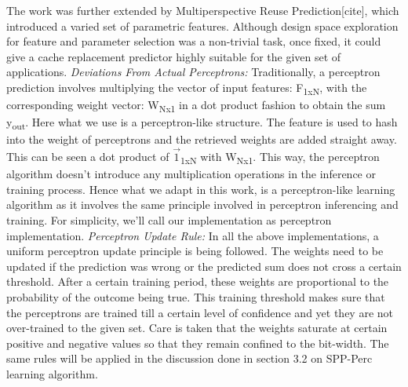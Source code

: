 \documentclass{sig-alternate}
\begin{document}
The work was further extended by Multiperspective Reuse Prediction[cite], which introduced a varied set of parametric features. Although design space exploration for feature and parameter selection was a non-trivial task, once fixed, it could give a cache replacement predictor highly suitable for the given set of applications.
\newline
\newline
\textit{Deviations From Actual Perceptrons:} Traditionally, a perceptron prediction involves multiplying the vector of input features: F\textsubscript{1xN}, with the corresponding weight vector: W\textsubscript{Nx1} in a dot product fashion to obtain the sum y\textsubscript{out}. Here what we use is a perceptron-like structure. The feature is used to hash into the weight of perceptrons and the retrieved weights are added straight away. This can be seen a dot product of $\vec{1}$\textsubscript{1xN} with W\textsubscript{Nx1}. This way, the perceptron algorithm doesn't introduce any multiplication operations in the inference or training process. Hence what we adapt in this work, is a perceptron-like learning algorithm as it involves the same principle involved in perceptron inferencing and training. For simplicity, we'll call our implementation as perceptron implementation.
\newline
\newline
\textit{Perceptron Update Rule:} In all the above implementations, a uniform perceptron update principle is being followed. The weights need to be updated if the prediction was wrong or the predicted sum does not cross a certain threshold. After a certain training period, these weights are proportional to the probability of the outcome being true. This training threshold makes sure that the perceptrons are trained till a certain level of confidence and yet they are not over-trained to the given set. Care is taken that the weights saturate at certain positive and negative values so that they remain confined to the bit-width. The same rules will be applied in the discussion done in section 3.2 on SPP-Perc learning algorithm.
\end{document}

